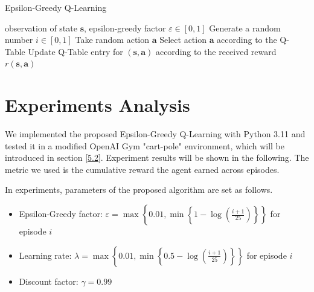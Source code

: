 \documentclass[10pt,a4paper]{article}
\begin{document}
\begin{algorithm}
\caption{Epsilon-Greedy Q-Learning}\label{alg:egql}
\begin{algorithmic}
\Require observation of state $\boldsymbol{s}$, epsilon-greedy factor $\varepsilon \in [0,1]$
\State Generate a random number $i \in [0,1]$
\State Take random action $\boldsymbol{a}$
\Else
\State Select action $\boldsymbol{a}$ according to the Q-Table 
\EndIf
\State Update Q-Table entry for $(\boldsymbol{s}, \boldsymbol{a})$ according to the received reward $r(\boldsymbol{s}, \boldsymbol{a})$ 
\EndWhile
\end{algorithmic}
\end{algorithm}

\section{Experiments Analysis}
We implemented the proposed Epsilon-Greedy Q-Learning with Python 3.11 and tested it in a modified OpenAI Gym "cart-pole" environment, which will be introduced in section \ref{5.2}. Experiment results will be shown in the following. The metric we used is the cumulative reward the agent earned across episodes. 

In experiments, parameters of the proposed algorithm are set as follows. 
\begin{itemize}
    \item Epsilon-Greedy factor: $\varepsilon = \max\left\{0.01, \min\left\{1-\log\left(\frac{i+1}{25}\right)\right\}\right\}$ for episode $i$
    \item Learning rate: $\lambda = \max\left\{0.01, \min\left\{0.5-\log\left(\frac{i+1}{25}\right)\right\}\right\}$ for episode $i$
    \item Discount factor: $\gamma = 0.99$ 
\end{itemize}
\end{document}
